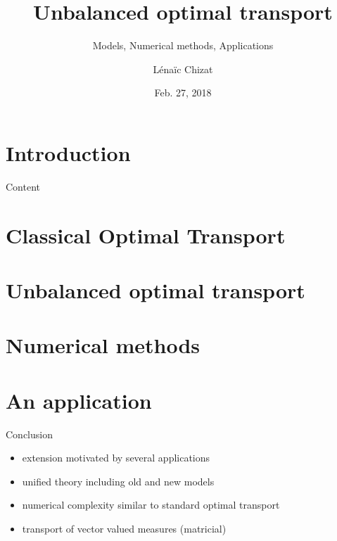 \documentclass{beamer}
\title{Unbalanced optimal transport}
\subtitle{Models, Numerical methods, Applications}
\author[Lénaïc Chizat]{
L\'ena\"ic Chizat
}
\date{Feb. 27, 2018}
\institute
{
INRIA Paris, SIERRA Team\\
PhD thesis prepared at Universit\'e Paris-Dauphine\\
Supervised by G. Peyr\'e and F.-X. Vialard  \\
}
\begin{document}
\begin{frame}[plain]
	\titlepage
\end{frame}
%

\section*{Introduction}

\begin{frame}{Content}
	\tableofcontents
\end{frame}


\section[Classical theory]{Classical Optimal Transport}

\section[Unbalanced OT]{Unbalanced optimal transport}

\section[Numerics]{Numerical methods}

\section[Application]{An application}


\begin{frame}{Conclusion}
\begin{itemize}
\item extension motivated by several applications
\item unified theory including old and new models
\item numerical complexity similar to standard optimal transport
\end{itemize}
\vspace{1cm}
\begin{itemize}
\item transport of vector valued measures (matricial)
\end{itemize}
\end{frame}
\end{document}

